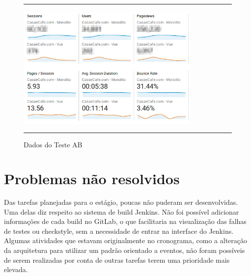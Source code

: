\begin{figure}[h]
  \rule[1ex]{\textwidth}{0.25pt}
  \centering\includegraphics[width=0.80\textwidth]{img/analytics.png}
  \caption[Dados do Teste AB]
  {Dados do Teste AB}\label{fig:analytics}
  \rule[1ex]{\textwidth}{0.25pt}
\end{figure}

%
%
%

\section{Problemas não resolvidos}

Das tarefas planejadas para o estágio, poucas não puderam ser desenvolvidas. Uma delas diz respeito ao sistema de build \gls{Jenkins}. Não foi possível adicionar informações de cada build no GitLab, o que facilitaria na visualização das falhas de testes ou \gls{checkstyle}, sem a necessidade de entrar na interface do \gls{Jenkins}.\\

Algumas atividades que estavam originalmente no cronograma, como a alteração da arquitetura para utilizar um padrão orientado a eventos, não foram possíveis de serem realizadas por conta de outras tarefas terem uma prioridade mais elevada.
